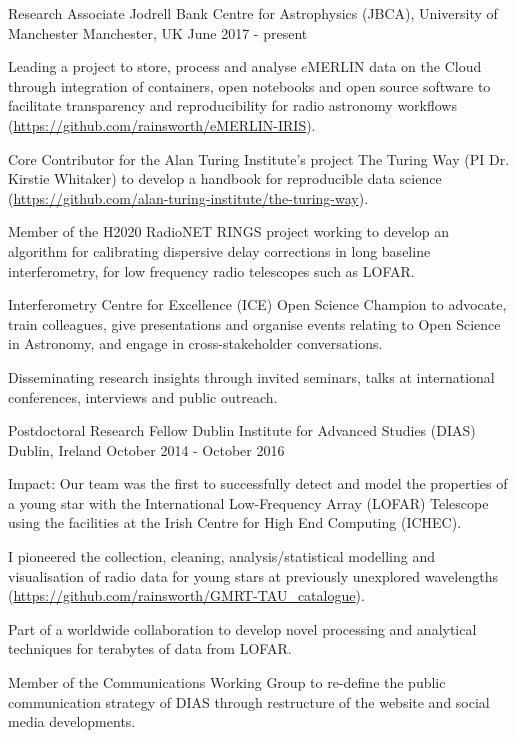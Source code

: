 \vspace{-6pt}
\begin{cventries}
  \cventry
    {Research Associate}
    {Jodrell Bank Centre for Astrophysics (JBCA), University of Manchester}
    {Manchester, UK}
    {June 2017 - present}
    {
      \begin{cvitems}
        \item {Leading a project to store, process and analyse $e$MERLIN data on the Cloud through integration of containers, open notebooks and open source software to facilitate transparency and reproducibility for radio astronomy workflows (\url{https://github.com/rainsworth/eMERLIN-IRIS}).}
        \item {Core Contributor for the Alan Turing Institute's project The Turing Way (PI Dr. Kirstie Whitaker) to develop a handbook for reproducible data science (\url{https://github.com/alan-turing-institute/the-turing-way}).}
        \item {Member of the H2020 RadioNET RINGS project working to develop an algorithm for calibrating dispersive delay corrections in long baseline interferometry, for low frequency radio telescopes such as LOFAR.}
        \item {Interferometry Centre for Excellence (ICE) Open Science Champion to advocate, train colleagues, give presentations and organise events relating to Open Science in Astronomy, and engage in cross-stakeholder conversations.}
        \item {Disseminating research insights through invited seminars, talks at international conferences, interviews and public outreach.}
      \end{cvitems}
    }\vspace{-6pt}

\cventry
    {Postdoctoral Research Fellow}
    {Dublin Institute for Advanced Studies (DIAS)}
    {Dublin, Ireland}
    {October 2014 - October 2016}
    {
      \begin{cvitems}
        \item{Impact: Our team was the first to successfully detect and model the properties of a young star with the International Low-Frequency Array (LOFAR) Telescope using the facilities at the Irish Centre for High End Computing (ICHEC).}        
        \item {I pioneered the collection, cleaning, analysis/statistical modelling and visualisation of radio data for young stars at previously unexplored wavelengths (\url{https://github.com/rainsworth/GMRT-TAU_catalogue}).}
        \item {Part of a worldwide collaboration to develop novel processing and analytical techniques for terabytes of data from LOFAR.}
        \item {Member of the Communications Working Group to re-define the public communication strategy of DIAS through restructure of the website and social media developments.}
      \end{cvitems}
    }\vspace{-15pt}


\end{cventries}
